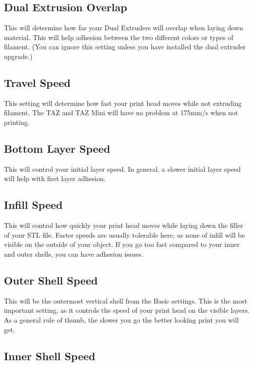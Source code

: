 \subsection{Dual Extrusion Overlap}

This will determine how far your Dual Extruders will overlap when laying down material. This will help adhesion between the two different colors or types of filament. (You can ignore this setting unless you have installed the dual extruder upgrade.)

\subsection{Travel Speed}

This setting will determine how fast your print head moves while not extruding filament. The TAZ and TAZ Mini will have no problem at 175mm/s when not printing.

\subsection{Bottom Layer Speed}

This will control your initial layer speed. In general, a slower initial layer speed will help with first layer adhesion. 

\subsection{Infill Speed}

This will control how quickly your print head moves while laying down the filler of your STL file. Faster speeds are usually tolerable here, as none of infill will be visible on the outside of your object. If you go too fast compared to your inner and outer shells, you can have adhesion issues.

\subsection{Outer Shell Speed}

This will be the outermost vertical shell from the Basic settings. This is the most important setting, as it controls the speed of your print head on the visible layers. As a general rule of thumb, the slower you go the better looking print you will get. 

\subsection{Inner Shell Speed}

